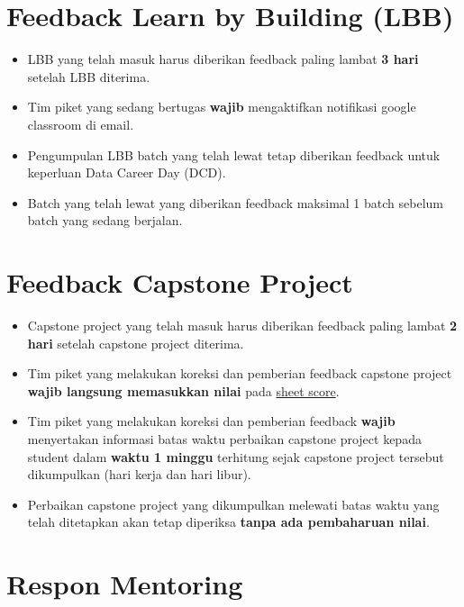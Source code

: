 \documentclass[
]{book}
\providecommand{\tightlist}{%
  \setlength{\itemsep}{0pt}\setlength{\parskip}{0pt}}
\begin{document}
\hypertarget{feedback-learn-by-building-lbb}{%
\section{Feedback Learn by Building (LBB)}\label{feedback-learn-by-building-lbb}}

\begin{itemize}
\tightlist
\item
  LBB yang telah masuk harus diberikan feedback paling lambat \textbf{3 hari} setelah LBB diterima.
\item
  Tim piket yang sedang bertugas \textbf{wajib} mengaktifkan notifikasi google classroom di email.
\item
  Pengumpulan LBB batch yang telah lewat tetap diberikan feedback untuk keperluan Data Career Day (DCD).
\item
  Batch yang telah lewat yang diberikan feedback maksimal 1 batch sebelum batch yang sedang berjalan.
\end{itemize}

\hypertarget{feedback-capstone-project}{%
\section{Feedback Capstone Project}\label{feedback-capstone-project}}

\begin{itemize}
\tightlist
\item
  Capstone project yang telah masuk harus diberikan feedback paling lambat \textbf{2 hari} setelah capstone project diterima.
\item
  Tim piket yang melakukan koreksi dan pemberian feedback capstone project \textbf{wajib langsung memasukkan nilai} pada \href{https://docs.google.com/spreadsheets/d/1cGJ0pn9k9gKCBnceWVwaL9D7BBDMNjLh8uPYlaBlJi8/edit?usp=sharing}{sheet score}.
\item
  Tim piket yang melakukan koreksi dan pemberian feedback \textbf{wajib} menyertakan informasi batas waktu perbaikan capstone project kepada student dalam \textbf{waktu 1 minggu} terhitung sejak capstone project tersebut dikumpulkan (hari kerja dan hari libur).
\item
  Perbaikan capstone project yang dikumpulkan melewati batas waktu yang telah ditetapkan akan tetap diperiksa \textbf{tanpa ada pembaharuan nilai}.
\end{itemize}

\hypertarget{respon-mentoring}{%
\section{Respon Mentoring}\label{respon-mentoring}}
\end{document}
